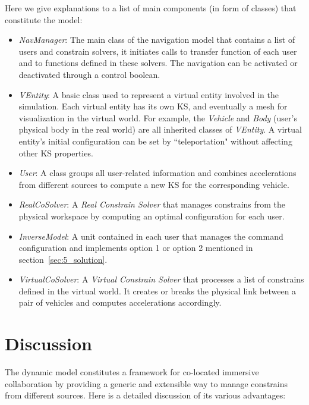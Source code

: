 Here we give explanations to a list of main components (in form of classes) that constitute the model:

\begin{itemize}
\item \textit{NavManager}: The main class of the navigation model that contains a list of users and constrain solvers, it initiates calls to transfer function of each user and to functions defined in these solvers. The navigation can be activated or deactivated through a control boolean.
\item \textit{VEntity}: A basic class used to represent a virtual entity involved in the simulation. Each virtual entity has its own KS, and eventually a mesh for visualization in the virtual world. For example, the \textit{Vehicle} and \textit{Body} (user's physical body in the real world) are all inherited classes of \textit{VEntity}. A virtual entity's initial configuration can be set by ``teleportation" without affecting other KS properties.
\item \textit{User}: A class groups all user-related information and combines accelerations from different sources to compute a new KS for the corresponding vehicle.
\item \textit{RealCoSolver}: A \textit{Real Constrain Solver} that manages constrains from the physical workspace by computing an optimal configuration for each user.
\item \textit{InverseModel}: A unit contained in each user that manages the command configuration and implements option 1 or option 2 mentioned in section~\ref{sec:5_solution}.
\item \textit{VirtualCoSolver}: A \textit{Virtual Constrain Solver} that processes a list of constrains defined in the virtual world. It creates or breaks the physical link between a pair of vehicles and computes accelerations accordingly. 
\end{itemize}


\section{Discussion}

The dynamic model constitutes a framework for co-located immersive collaboration by providing a generic and extensible way to manage constrains from different sources. Here is a detailed discussion of its various advantages:

